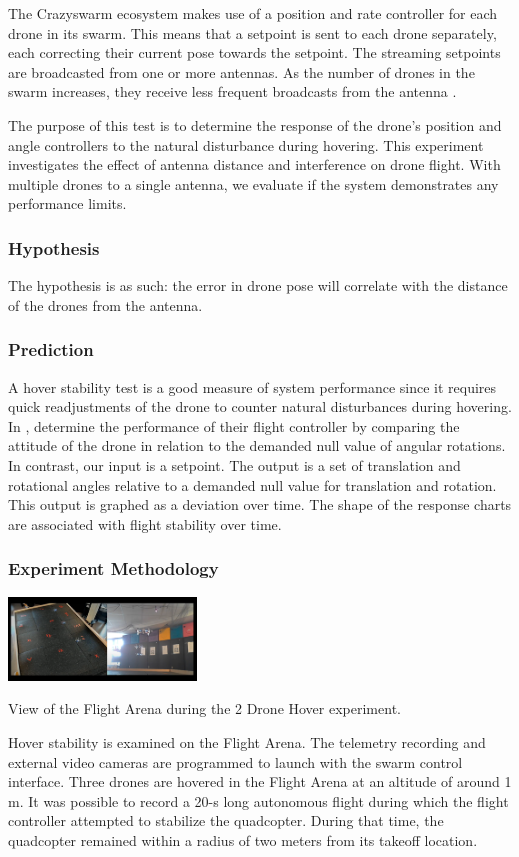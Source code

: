The Crazyswarm ecosystem \cite{crazyflie_docs} makes use of a position and rate controller for each drone in its swarm. This means that a setpoint is sent to each drone separately, each correcting their current pose towards the setpoint. The streaming setpoints are broadcasted from one or more antennas. As the number of drones in the swarm increases, they receive less frequent broadcasts from the antenna \cite{preiss_hönig_sukhatme_ayanian_2017}.

The purpose of this test is to determine the response of the drone's position and angle controllers to the natural disturbance during hovering. This experiment investigates the effect of antenna distance and interference on drone flight. With multiple drones to a single antenna, we evaluate if the system demonstrates any performance limits. 

\subsubsection{Hypothesis}
The hypothesis is as such: the error in drone pose will correlate with the distance of the drones from the antenna. 

\subsubsection{Prediction}
A hover stability test is a good measure of system performance since it requires quick readjustments of the drone to counter natural disturbances during hovering. In \cite{experimental_tuning},  determine the performance of their flight controller by comparing the attitude of the drone in relation to the demanded null value of angular rotations. In contrast, our input is a setpoint. The output is a set of translation and rotational angles relative to a demanded null value for translation and rotation. This output is graphed as a deviation over time. The shape of the response charts are associated with flight stability over time.


\subsubsection{Experiment Methodology}
\begin{marginfigure}%
    \raggedright
    \includegraphics[width=5cm]{images/chore_pictures/3drones/pic.png}
    \caption{View of the Flight Arena during the 2 Drone Hover experiment.}
\end{marginfigure}
 Hover stability is examined on the Flight Arena. The telemetry recording and external video cameras are programmed to launch with the swarm control interface. Three drones are hovered in the Flight Arena at an altitude of around 1 m.  It was possible to record a 20-s long autonomous flight during which the flight controller attempted to stabilize the quadcopter. During that time, the quadcopter remained within a radius of two meters from its takeoff location. 

